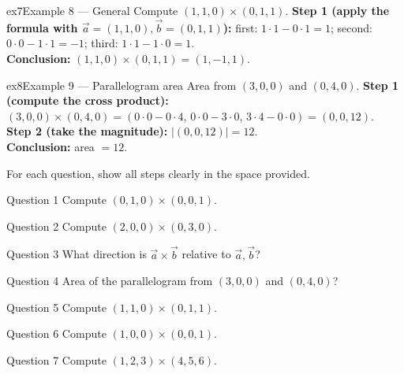 \documentclass[11pt]{article}
\begin{document}
\begin{example}{ex7}{Example 8 --- General}
Compute $(1,1,0)\times(0,1,1)$.\soln
\textbf{Step 1 (apply the formula with $\vec a=(1,1,0),\vec b=(0,1,1)$):} first: $1\cdot1-0\cdot1=1$; second: $0\cdot0-1\cdot1=-1$; third: $1\cdot1-1\cdot0=1$.\\[3pt]
\textbf{Conclusion:} $(1,1,0)\times(0,1,1)=(1,-1,1)$.
\end{example}

\begin{example}{ex8}{Example 9 --- Parallelogram area}
Area from $(3,0,0)$ and $(0,4,0)$.\soln
\textbf{Step 1 (compute the cross product):} $(3,0,0)\times(0,4,0)=(0\cdot0-0\cdot4,\,0\cdot0-3\cdot0,\,3\cdot4-0\cdot0)=(0,0,12)$.\\[3pt]
\textbf{Step 2 (take the magnitude):} $|(0,0,12)|=12$.\\[3pt]
\textbf{Conclusion:} area $=12$.
\end{example}

\clearpage
{}
For each question, show all steps clearly in the space provided.

\begin{qbox}{Question 1}
Compute $(0,1,0)\times(0,0,1)$.\workspace{2.4cm}
\end{qbox}

\begin{qbox}{Question 2}
Compute $(2,0,0)\times(0,3,0)$.\workspace{2.4cm}
\end{qbox}

\begin{qbox}{Question 3}
What direction is $\vec a\times\vec b$ relative to $\vec a,\vec b$?\workspace{2.4cm}
\end{qbox}

\begin{qbox}{Question 4}
Area of the parallelogram from $(3,0,0)$ and $(0,4,0)$?\workspace{2.4cm}
\end{qbox}

\begin{qbox}{Question 5}
Compute $(1,1,0)\times(0,1,1)$.\workspace{2.4cm}
\end{qbox}

\begin{qbox}{Question 6}
Compute $(1,0,0)\times(0,0,1)$.\workspace{2.4cm}
\end{qbox}

\begin{qbox}{Question 7}
Compute $(1,2,3)\times(4,5,6)$.\workspace{2.4cm}
\end{qbox}
\end{document}
